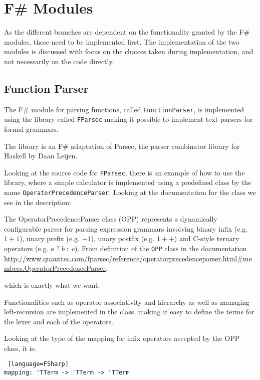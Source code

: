 \section{F\# Modules} \label{sec:Implementation-FSharpModules}
As the different branches are dependent on the functionality granted by the F\# modules, these need to be implemented first. The implementation of the two modules is discussed with focus on the choices taken during implementation, and not necessarily on the code directly.

\subsection{Function Parser} \label{ssec:Implementation-FunctionParser}
The F\# module for parsing functions, called \texttt{FunctionParser}, is implemented using the library called \texttt{FParsec} making it possible to implement text parsers for formal grammars. \cite{FParsec}

The library is an F\# adaptation of Parsec, the parser combinator library for Haskell by Daan Leijen. \cite{Parsec}

Looking at the source code for \texttt{FParsec}, there is an example of how to use the library, where a simple calculator is implemented using a predefined class by the name \texttt{OperatorPrecedenceParser}. Looking at the documentation for the class we see in the description:

\quoteref
{
The OperatorPrecedenceParser class (OPP) represents a dynamically configurable parser for parsing expression grammars involving binary infix (e.g. $1 + 1$), unary prefix (e.g. $-1$), unary postfix (e.g. $1++$) and C‐style ternary operators (e.g. $a \; ? \; b \; : \; c$).
}
{
From definition of the \texttt{OPP} class in the documentation \url{http://www.quanttec.com/fparsec/reference/operatorprecedenceparser.html\#members.OperatorPrecedenceParser}.
}

which is exactly what we want.

Functionalities such as operator associativity and hierarchy as well as managing left-recursion are implemented in the class, making it easy to define the terms for the lexer and each of the operators. 

Looking at the type of the mapping for infix operators accepted by the OPP class, it is:

\begin{lstlisting} [language=FSharp]
mapping: 'TTerm -> 'TTerm -> 'TTerm
\end{lstlisting}

